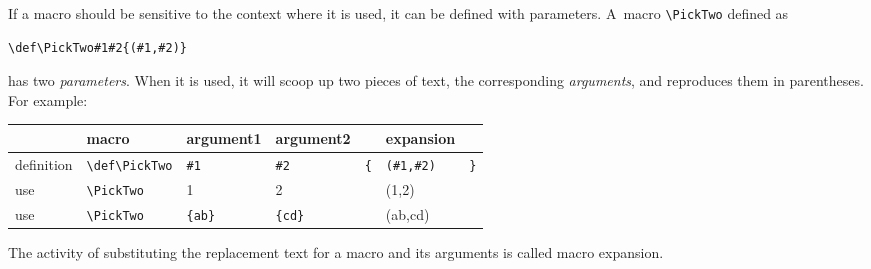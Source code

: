 \documentclass[letterpaper]{book}
\begin{document}
If a macro should be sensitive to the context
where it is used, it can be defined with parameters.
A~macro \verb+\PickTwo+ defined as
\begin{verbatim}
\def\PickTwo#1#2{(#1,#2)}
\end{verbatim}
has two \emph{parameters}. When it is used, it will scoop up two pieces of
text, the corresponding \emph{arguments},
and reproduces them in parentheses.
For example:

\begin{tabular}{|l|llllll|}
\hline
          &macro              &argument1& argument2& 
    &expansion&\\ \hline
definition&\verb+\def\PickTwo+&\verb+#1+& \verb+#2+& \verb+{+& 
    \verb+(#1,#2)+& \verb+}+\\
use&       \verb+\PickTwo+&1&2&&(1,2)&\\
use&       \verb+\PickTwo+&\verb+{ab}+&\verb+{cd}+&&(ab,cd)&\\
\hline
\end{tabular}

The activity of substituting the replacement text
for a macro and its arguments is called {\italic macro expansion}.

\end{document}
